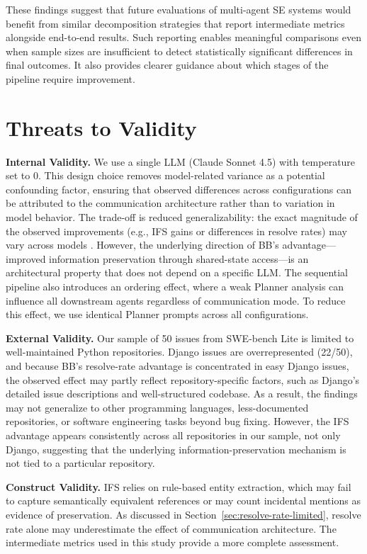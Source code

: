 \documentclass{ieeeaccess}
\begin{document}
These findings suggest that future evaluations of multi-agent SE systems would benefit from similar decomposition strategies that report intermediate metrics alongside end-to-end results. Such reporting enables meaningful comparisons even when sample sizes are insufficient to detect statistically significant differences in final outcomes. It also provides clearer guidance about which stages of the pipeline require improvement.

\section{Threats to Validity}
\label{sec:threats}

\textbf{Internal Validity.} We use a single LLM (Claude Sonnet 4.5) with temperature set to 0. This design choice removes model-related variance as a potential confounding factor, ensuring that observed differences across configurations can be attributed to the communication architecture rather than to variation in model behavior. The trade-off is reduced generalizability: the exact magnitude of the observed improvements (e.g., IFS gains or differences in resolve rates) may vary across models \cite{brown2020language}. However, the underlying direction of BB's advantage---improved information preservation through shared-state access---is an architectural property that does not depend on a specific LLM. The sequential pipeline also introduces an ordering effect, where a weak Planner analysis can influence all downstream agents regardless of communication mode. To reduce this effect, we use identical Planner prompts across all configurations.

\textbf{External Validity.} Our sample of 50 issues from SWE-bench Lite is limited to well-maintained Python repositories. Django issues are overrepresented (22/50), and because BB's resolve-rate advantage is concentrated in easy Django issues, the observed effect may partly reflect repository-specific factors, such as Django's detailed issue descriptions and well-structured codebase. As a result, the findings may not generalize to other programming languages, less-documented repositories, or software engineering tasks beyond bug fixing. However, the IFS advantage appears consistently across all repositories in our sample, not only Django, suggesting that the underlying information-preservation mechanism is not tied to a particular repository.

\textbf{Construct Validity.} IFS relies on rule-based entity extraction, which may fail to capture semantically equivalent references or may count incidental mentions as evidence of preservation. As discussed in Section~\ref{sec:resolve-rate-limited}, resolve rate alone may underestimate the effect of communication architecture. The intermediate metrics used in this study provide a more complete assessment.
\end{document}
